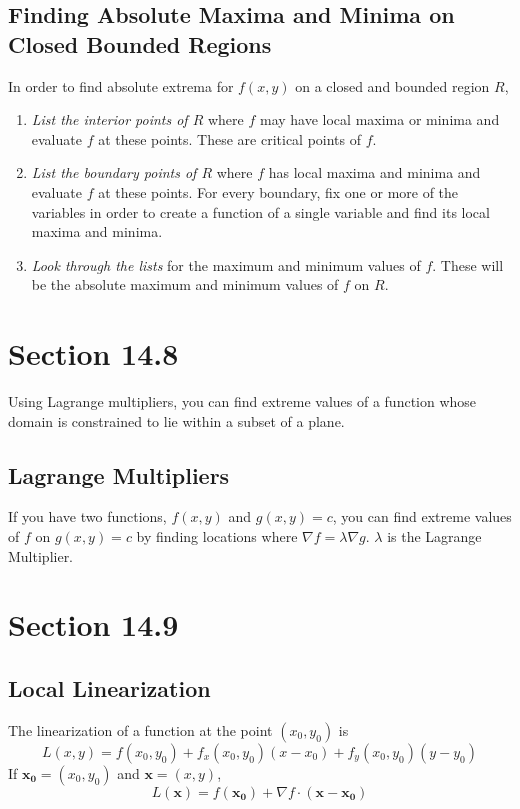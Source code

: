\documentclass[12pt]{article}
\theoremstyle{break}
\numberwithin{theorem}{subsection}
\numberwithin{lemma}{subsection}
\numberwithin{corollary}{subsection}
\numberwithin{equation}{subsection}
\newcommand{\vect}[1]{\boldsymbol{#1}}
\begin{document}
\subsection{Finding Absolute Maxima and Minima on Closed Bounded Regions}
In order to find absolute extrema for $f(x,y)$ on a closed and bounded region $R$, 
\begin{enumerate}
\item \textit{List the interior points of $R$} where $f$ may have local maxima or minima and 
	evaluate $f$ at these points. These are critical points of $f$.
\item \textit{List the boundary points of $R$} where $f$ has local maxima and minima and evaluate 
	$f$ at these points. For every boundary, fix one or more of the variables in order to create a
	function of a single variable and find its local maxima and minima. 
\item \textit{Look through the lists} for the maximum and minimum values of $f$. These will be the
	absolute maximum and minimum values of $f$ on $R$.
\end{enumerate}

\section{Section 14.8}
Using Lagrange multipliers, you can find extreme values of a function whose domain is constrained to
lie within a subset of a plane.

\subsection{Lagrange Multipliers}
If you have two functions, $f(x,y)$ and $g(x,y) = c$, you can find extreme values of $f$ on $g(x,y) = c$ by finding
locations where $\nabla f = \lambda \nabla g$. $\lambda$ is the Lagrange Multiplier. 

\section{Section 14.9}

\subsection{Local Linearization}
The linearization of a function at the point $(x_0, y_0)$ is 
\begin{equation*}
	L(x,y) = f(x_0, y_0) + f_x(x_0, y_0)(x - x_0) + f_y(x_0, y_0)(y - y_0)
\end{equation*}
If $\vect{x_0} = (x_0, y_0)$ and $\vect{x} = (x,y)$,
\begin{equation*}
	L(\vect{x}) = f(\vect{x_0}) + \nabla f \cdot (\vect{x} - \vect{x_0})
\end{equation*}
\end{document}
